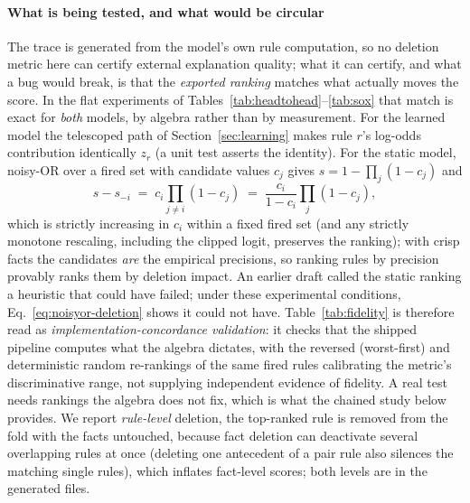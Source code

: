 \paragraph{What is being tested, and what would be circular} The trace
is generated from the model's own rule computation, so no deletion
metric here can certify external explanation quality; what it can
certify, and what a bug would break, is that the \emph{exported
ranking} matches what actually moves the score. In the flat
experiments of Tables~\ref{tab:headtohead}--\ref{tab:sox} that match
is exact for \emph{both} models, by algebra rather than by
measurement. For the learned model the telescoped path of
Section~\ref{sec:learning} makes rule $r$'s log-odds contribution
identically $z_r$ (a unit test asserts the identity). For the static
model, noisy-OR over a fired set with candidate values $c_j$ gives
$s = 1 - \prod_j (1 - c_j)$ and
\begin{equation}
s - s_{-i} \;=\; c_i \prod_{j \ne i} (1 - c_j)
\;=\; \frac{c_i}{1 - c_i} \prod_{j} (1 - c_j),
\label{eq:noisyor-deletion}
\end{equation}
which is strictly increasing in $c_i$ within a fixed fired set (and
any strictly monotone rescaling, including the clipped logit,
preserves the ranking); with crisp facts the candidates \emph{are}
the empirical precisions, so ranking rules by precision provably
ranks them by deletion impact. An earlier draft called the static
ranking a heuristic that could have failed; under these experimental
conditions, Eq.~\eqref{eq:noisyor-deletion} shows it could not have.
Table~\ref{tab:fidelity} is therefore read as
\emph{implementation-concordance validation}: it checks that the
shipped pipeline computes what the algebra dictates, with the
reversed (worst-first) and deterministic random re-rankings of the
same fired rules calibrating the metric's discriminative range, not
supplying independent evidence of fidelity. A real test needs
rankings the algebra does not fix, which is what the
chained study below provides. We report \emph{rule-level} deletion,
the top-ranked rule is removed from the
fold with the facts untouched, because fact deletion can deactivate
several overlapping rules at once (deleting one antecedent of a pair
rule also silences the matching single rules), which inflates
fact-level scores; both levels are in the generated files.


